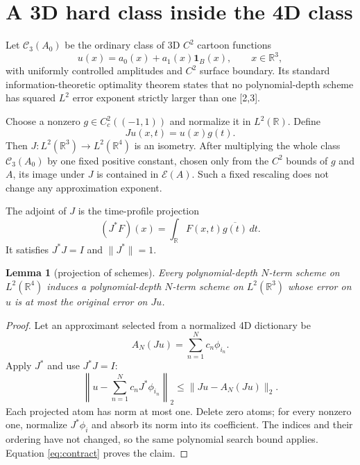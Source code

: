\documentclass[11pt]{article}
\newtheorem{lemma}{Lemma}
\newcommand{\R}{\mathbb R}
\newcommand{\E}{\mathcal E}
\newcommand{\C}{\mathcal C}
\begin{document}
\section{A 3D hard class inside the 4D class}

Let $\C_3(A_0)$ be the ordinary class of 3D $C^2$ cartoon functions
\[
 u(x)=a_0(x)+a_1(x)\mathbf1_B(x),\qquad x\in\R^3,
\]
with uniformly controlled amplitudes and $C^2$ surface boundary.  Its standard
information-theoretic optimality theorem states that no polynomial-depth
scheme has squared $L^2$ error exponent strictly larger than one [2,3].

Choose a nonzero $g\in C_c^2((-1,1))$ and normalize it in $L^2(\R)$.  Define
\begin{equation}\label{eq:J}
 Ju(x,t)=u(x)g(t).
\end{equation}
Then $J:L^2(\R^3)\to L^2(\R^4)$ is an isometry.  After multiplying the whole
class $\C_3(A_0)$ by one fixed positive constant, chosen only from the $C^2$
bounds of $g$ and $A$, its image under $J$ is contained in $\E(A)$.  Such a
fixed rescaling does not change any approximation exponent.

The adjoint of $J$ is the time-profile projection
\begin{equation}\label{eq:adjoint}
 (J^*F)(x)=\int_{\R}F(x,t)\overline{g(t)}\,dt.
\end{equation}
It satisfies $J^*J=I$ and $\|J^*\|=1$.

\begin{lemma}[projection of schemes]\label{lem:projection}
Every polynomial-depth $N$-term scheme on $L^2(\R^4)$ induces a
polynomial-depth $N$-term scheme on $L^2(\R^3)$ whose error on $u$ is at most
the original error on $Ju$.
\end{lemma}

\begin{proof}
Let an approximant selected from a normalized 4D dictionary be
\[
 A_N(Ju)=\sum_{n=1}^N c_n\phi_{i_n}.
\]
Apply $J^*$ and use $J^*J=I$:
\begin{equation}\label{eq:contract}
 \left\|u-\sum_{n=1}^N c_nJ^*\phi_{i_n}\right\|_2
 \le \|Ju-A_N(Ju)\|_2.
\end{equation}
Each projected atom has norm at most one.  Delete zero atoms; for every
nonzero one, normalize $J^*\phi_i$ and absorb its norm into its coefficient.
The indices and their ordering have not changed, so the same polynomial search
bound applies.  Equation \eqref{eq:contract} proves the claim.
\end{proof}
\end{document}
